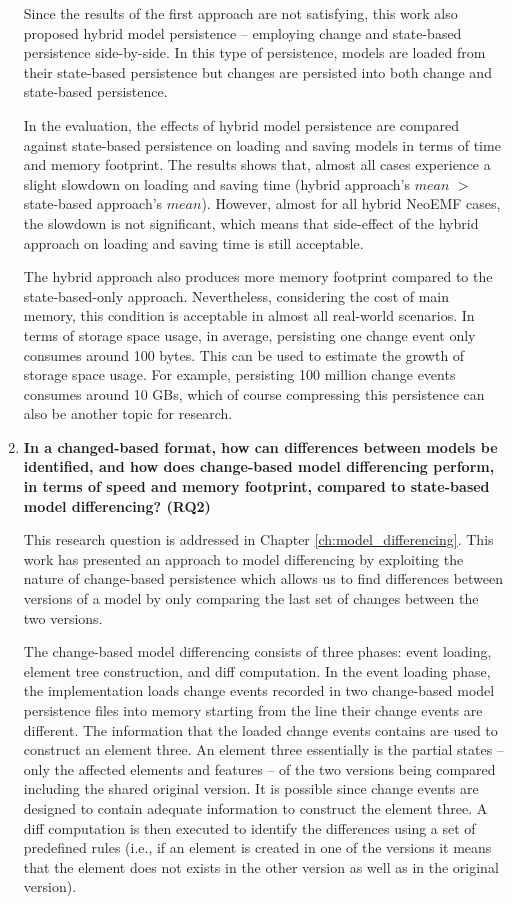 \begin{enumerate}
  Since the results of the first approach are not satisfying, this work also proposed hybrid model persistence -- employing change and state-based persistence side-by-side. In this type of persistence, models are loaded from their state-based persistence but changes are persisted into both change and state-based persistence.  
  
  In the evaluation, the effects of hybrid model persistence are compared against state-based persistence on loading and saving models in terms of time and memory footprint. The results shows that, almost all cases experience a slight slowdown on loading and saving time (hybrid approach's $mean$ $>$ state-based approach's $mean$). However, almost for all hybrid NeoEMF cases, the slowdown is not significant, which means that side-effect of the hybrid approach on loading and saving time is still acceptable. 
  
  The hybrid approach also produces more memory footprint compared to the state-based-only approach. Nevertheless, considering the cost of main memory, this condition is acceptable in almost all real-world scenarios. In terms of storage space usage, in average, persisting one change event only consumes around 100 bytes. This can be used to estimate the growth of storage space usage. For example, persisting 100 million change events consumes around 10 GBs, which of course compressing this persistence can also be another topic for research.  
  
  \item \textbf{In a changed-based format, how can differences between models be identified, and how does change-based model differencing perform, in terms of speed and memory footprint, compared to state-based model differencing? (RQ2)}
  
 This research question is addressed in Chapter \ref{ch:model_differencing}.  This work has presented an approach to model differencing by exploiting the nature of change-based persistence which allows us to find differences between versions of a model by only comparing the last set of changes between the two versions.
 
 The change-based model differencing consists of three phases: event loading, element tree construction, and diff computation. In the event loading phase, the implementation loads change events recorded in two change-based model persistence files into memory starting from the line their change events are different. The information that the loaded change events contains are used to construct an element three. An element three essentially is the partial states -- only the affected elements and features -- of the two versions being compared including the shared original version. It is possible since change events are designed to contain adequate information to construct the element three. A diff computation is then executed to identify the differences using a set of predefined rules (i.e., if an element is created in one of the versions it means that the element does not exists in the other version as well as in the original version).


\end{enumerate}
